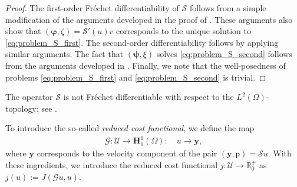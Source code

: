 \documentclass[final]{siamart0216}
\begin{document}
\begin{proof}
The first-order Fr\'echet differentiability of $\mathcal{S}$ follows from a simple modification of the arguments developed in the proof of \cite[Theorem 4.17]{MR2583281}. These arguments also show that $(\boldsymbol{\varphi},\zeta) = \mathcal{S}'(u)v$ corresponds to the unique solution to \eqref{eq:problem_S_first}. The second-order differentiability follows by applying similar arguments. The fact that $(\boldsymbol{\psi},\xi)$ solves \eqref{eq:problem_S_second} follows from the arguments developed in \cite[Theorem 4.24]{MR2583281}. Finally, we note that the well-posedness of problems \eqref{eq:problem_S_first} and \eqref{eq:problem_S_second} is trivial.
\end{proof}

\begin{remark}
The operator $\mathcal{S}$ is not Fr\'echet differentiable with respect to the $L^2(\Omega)$-topology; see \cite[Remark 2.8]{MR2536007}.
\end{remark}

To introduce the so-called \emph{reduced cost functional}, we define the map
\begin{align}\label{eq:mapG}
\mathcal{G}: \mathcal{U}\to \mathbf{H}_0^1(\Omega) :
\quad u\to \mathbf{y},
\end{align}
where $\mathbf{y}$ corresponds to the velocity component of the pair $(\mathbf{y},\mathsf{p})=\mathcal{S}u$. With these ingredients, we introduce the reduced cost functional $j:\mathcal{U}\to\mathbb{R}_0^+$ as $j(u) := J(\mathcal{G}u,u)$.
\end{document}
